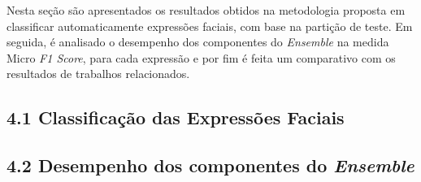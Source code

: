Nesta seção são apresentados os resultados obtidos na metodologia proposta em classificar automaticamente expressões faciais, com base na partição de teste. Em seguida, é analisado o desempenho dos componentes do \textit{Ensemble} na medida Micro \textit{F1 Score}, para cada expressão e por fim  é feita um comparativo com os resultados de trabalhos relacionados. %

\subsection{4.1 Classificação das Expressões Faciais}


\subsection{4.2 Desempenho dos componentes do \textit{Ensemble}}


% 
